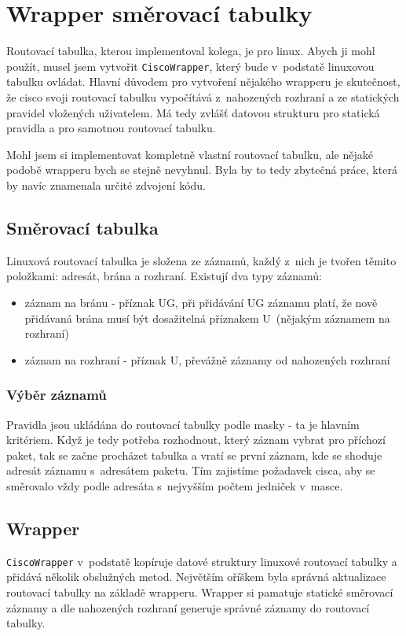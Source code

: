 \section{Wrapper směrovací tabulky}
Routovací tabulka, kterou implementoval kolega, je  pro linux. Abych ji mohl použít, musel jsem vytvořit \verb|CiscoWrapper|, který bude v~podstatě linuxovou tabulku ovládat. Hlavní důvodem pro vytvoření nějakého wrapperu je skutečnost, že cisco svoji routovací tabulku vypočítává z~nahozených rozhraní a ze statických pravidel vložených uživatelem. Má tedy zvlášť datovou strukturu pro statická pravidla a pro samotnou routovací tabulku.

Mohl jsem si implementovat kompletně vlastní routovací tabulku, ale nějaké podobě wrapperu bych se stejně nevyhnul. Byla by to tedy zbytečná práce, která by navíc znamenala určité zdvojení kódu.


\subsection{Směrovací tabulka}
Linuxová routovací tabulka je složena ze záznamů, každý z~nich je tvořen těmito položkami: adresát, brána a rozhraní. Existují dva typy záznamů:
\begin{itemize}
 \item záznam na bránu - příznak UG, při přidávání UG záznamu platí, že nově přidávaná brána musí být dosažitelná příznakem U~(nějakým záznamem na rozhraní)
 \item záznam na rozhraní - příznak U, převážně záznamy od nahozených rozhraní
\end{itemize}


\subsubsection{Výběr záznamů}
Pravidla jsou ukládána do routovací tabulky podle masky - ta je hlavním kritériem. Když je tedy potřeba rozhodnout, který záznam vybrat pro příchozí paket, tak se začne procházet tabulka a vratí se první záznam, kde se shoduje adresát záznamu s~adresátem paketu. Tím zajistíme požadavek cisca, aby se směrovalo vždy podle adresáta s~nejvyšším počtem jedniček v~masce.

\subsection{Wrapper}
\verb|CiscoWrapper| v~podstatě kopíruje datové struktury linuxové routovací tabulky a přidává několik obslužných metod. Největším oříškem byla správná aktualizace routovací tabulky na základě wrapperu. Wrapper si pamatuje statické směrovací záznamy a dle nahozených rozhraní generuje správné záznamy do routovací tabulky. 


